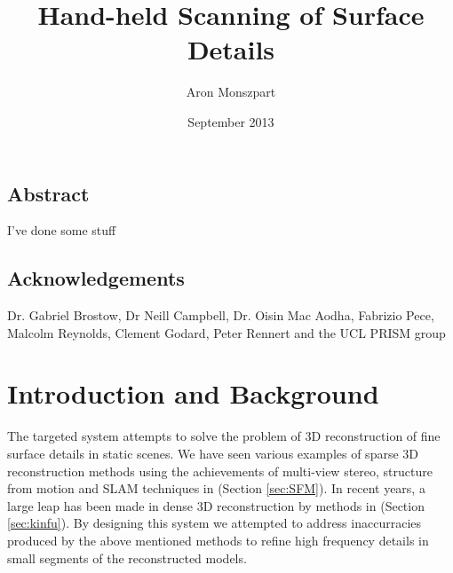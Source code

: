 \documentclass{ucl_thesis}
\author{Aron Monszpart}
\title{Hand-held Scanning of Surface Details}
\date{September 2013}
\newcommand{\secref}[1]{(Section \ref{#1})}
\begin{document}

\maketitle
{}
\setcounter{page}{1}
\pagestyle{plain}



\newpage
\section*{Abstract}
I've done some stuff
%


\newpage
\section*{Acknowledgements}
Dr. Gabriel Brostow, Dr Neill Campbell, Dr. Oisin Mac Aodha, Fabrizio Pece, Malcolm Reynolds, Clement Godard, Peter Rennert and the UCL PRISM group

\tableofcontents
\listoffigures
\newpage

\setcounter{page}{1}
\pagestyle{plain}

\chapter{Introduction and Background} 

\par The targeted system attempts to solve the problem of 3D reconstruction of fine surface details in static scenes. We have seen various examples of sparse 3D reconstruction methods using the achievements of multi-view stereo, structure from motion and SLAM techniques in \secref{sec:SFM}. In recent years, a large leap has been made in dense 3D reconstruction by methods in \secref{sec:kinfu}. By designing this system we attempted to address inaccurracies produced by the above mentioned methods to refine high frequency details in small segments of the reconstructed models.
\end{document}
